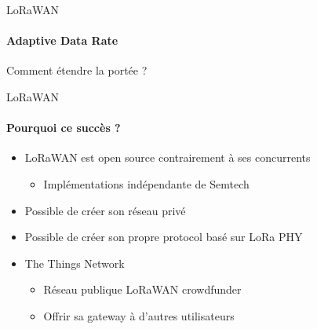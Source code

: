 \begin{frame}{LoRaWAN}
\framesubtitle{Adaptive Data Rate}
\begin{block}{}
{
  Comment étendre la portée ?
}
\end{block}

\end{frame}

\begin{frame}{LoRaWAN}
\framesubtitle{Pourquoi ce succès ?}
\begin{itemize}
  \item LoRaWAN est open source contrairement à ses concurrents
  \begin{itemize}
    \item Implémentations indépendante de Semtech
  \end{itemize}
  \item Possible de créer son réseau privé  
  \item Possible de créer son propre protocol basé sur LoRa PHY
  \item The Things Network
  \begin{itemize}
    \item Réseau publique LoRaWAN crowdfunder
    \item Offrir sa gateway à d'autres utilisateurs
  \end{itemize}
\end{itemize}
\end{frame}

